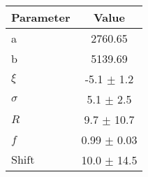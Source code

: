 \begin{table}[h]
    \centering
    \begin{tabular}{lc}
        \toprule
        Parameter & Value \\
        \midrule
        a & 2760.65 \\
        b & 5139.69 \\
      $\xi$ & -5.1 $\pm$ 1.2 \\
      $\sigma$ & 5.1 $\pm$ 2.5 \\
      $R$ & 9.7 $\pm$ 10.7 \\
      $f$ & 0.99 $\pm$ 0.03 \\
      $\mathrm{Shift}$ & 10.0 $\pm$ 14.5 \\
  \bottomrule
  \end{tabular}
\end{table}
